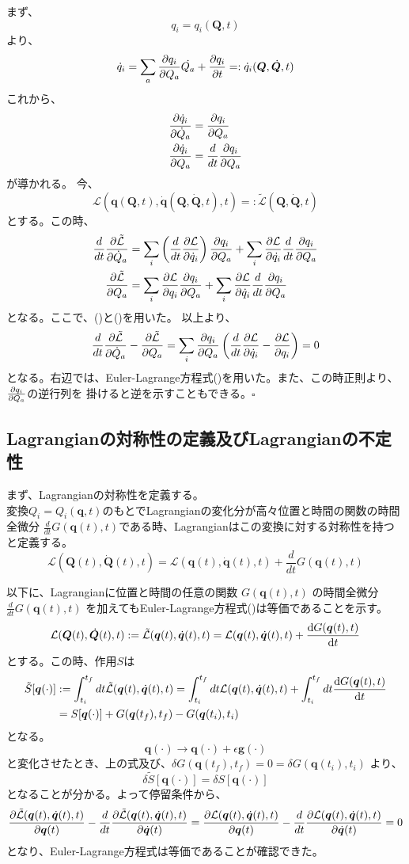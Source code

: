 \documentclass[a4paper,11pt]{ltjsarticle}
\newcommand{\qv}{\bm{q}}
\newcommand{\La}{\mathcal{L}}
\newcommand{\Laq}{\mathcal{L}(\qv(t),\dot{\qv}(t),t)}
\newcommand{\intS}{\int_{t_i}^{t_f}dt}
\begin{document}
まず、
\[
q_i=q_i(\bm{Q},t)
\]
より、
\[
\dot{q}_i=\sum_{a}\pdv{q_i}{Q_a}\dot{Q_a}+\pdv{q_i}{t}=:\dot{q}_i(\bm{Q},\dot{\bm{Q}},t)
\]
これから、
\begin{align}
\pdv{\dot{q}_i}{\dot{Q}_a}&=\pdv{q_i}{Q_a}
\label{eq:1}
\\ \pdv{\dot{q}_i}{Q_a}&=\frac{d}{dt}\pdv{q_i}{Q_a}
\label{eq:2}
\end{align}
が導かれる。
今、
\[
\La(\bm{q}(\bm{Q},t),\dot{\qv}(\bm{Q},\dot{\bm{Q}},t),t)=:\tilde{\La}(\bm{Q},\dot{\bm{Q}},t)
\]
とする。この時、
\begin{align*}
\frac{d}{dt}\pdv{\tilde{\La}}{\dot{Q}_a}&=\sum_{i}\left(\frac{d}{dt}\pdv{\La}{\dot{q}_i}\right)\pdv{q_i}{Q_a}+\sum_{i}\pdv{\La}{\dot{q_i}}\frac{d}{dt}\pdv{q_i}{Q_a}
\\
\pdv{\tilde{\La}}{Q_a}&=\sum_{i}\pdv{\La}{q_i}\pdv{q_i}{Q_a}+\sum_{i}\pdv{\La}{\dot{q}_i}\frac{d}{dt}\pdv{q_i}{Q_a}
\end{align*}
となる。ここで、()と()を用いた。
以上より、
\[
\frac{d}{dt}\pdv{\tilde{\La}}{\dot{Q}_a}-\pdv{\tilde{\La}}{Q_a}=\sum_{i}\pdv{q_i}{Q_a}\left(\frac{d}{dt}\pdv{\La}{\dot{q}_i}-\pdv{\La}{q_i}\right)=0
\]
となる。右辺では、Euler-Lagrange方程式()を用いた。また、この時正則より、$\pdv{q_i}{Q_a}$の逆行列を
掛けると逆を示すこともできる。$\square$

\subsection{Lagrangianの対称性の定義及びLagrangianの不定性}
\label{sec:invariance}
まず、Lagrangianの対称性を定義する。
\\変換$Q_i=Q_i(\bm{q},t)$のもとでLagrangianの変化分が高々位置と時間の関数の時間全微分 $\frac{d}{dt}G(\qv(t),t)$である時、Lagrangianはこの変換に対する対称性を持つと定義する。
\[
\La(\bm{Q}(t),\dot{\bm{Q}}(t),t)=\La(\qv(t),\dot{\qv}(t),t)+\frac{d}{dt}G(\qv(t),t)
\]

以下に、Lagrangianに位置と時間の任意の関数 $G(\qv(t),t)$ の時間全微分 $\frac{d}{dt}G(\qv(t),t)$
を加えてもEuler-Lagrange方程式()は等価であることを示す。
\[
\La(\bm{Q}(t),\dot{\bm{Q}}(t),t):=\tilde{\La}(\qv(t),\dot{\qv}(t),t)=\Laq+\dv{G(\qv(t),t)}{t}
\]
とする。この時、作用$S$は
\begin{align*}
\tilde{S}[\qv(\cdot)] &:= \intS\tilde{\La}(\qv(t),\dot{\qv}(t),t)=\intS\Laq+\intS\dv{G(\qv(t),t)}{t}
\\ &= S[\qv(\cdot)]+G(\qv(t_f),t_f)-G(\qv(t_i),t_i)
\end{align*}
となる。
\[
\qv(\cdot) \rightarrow \qv(\cdot)+\epsilon \bm{g}(\cdot)
\]
と変化させたとき、上の式及び、$\delta G(\qv(t_f),t_f)=0=\delta G(\qv(t_i),t_i)$ より、
\[
\delta\tilde{S}[\qv(\cdot)]=\delta S[\qv(\cdot)]
\]
となることが分かる。よって停留条件から、
\[
\pdv{\tilde{\La}(\qv(t),\dot{\qv}(t),t)}{\qv(t)}-\frac{d}{dt}\pdv{\tilde{\La}(\qv(t),\dot{\qv}(t),t)}{\dot{\qv}(t)}=\pdv{\La(\qv(t),\dot{\qv}(t),t)}{\qv(t)}-\frac{d}{dt}\pdv{\La(\qv(t),\dot{\qv}(t),t)}{\dot{\qv}(t)}=0
\]
となり、Euler-Lagrange方程式は等価であることが確認できた。
\end{document}
